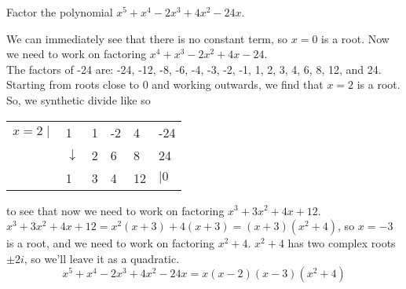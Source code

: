 \begin{example}
Factor the polynomial $x^5 + x^4 -2x^3 + 4x^2 -24x$.	
\end{example}
\begin{answer}
	We can immediately see that there is no constant term, so $x=0$ is a root. Now we need to work on factoring $x^4 + x^3 -2x^2 + 4x - 24$.\\
	The factors of -24 are: -24, -12, -8, -6, -4, -3, -2, -1, 1, 2, 3, 4, 6, 8, 12, and 24. Starting from roots close to 0 and working outwards, we find that $x=2$ is a root. So, we synthetic divide like so
	\begin{table}[H]
		\centering
		\begin{tabular}{llllll}
			$x=2 \mid$ & 1            & 1 & -2 & 4  & -24 \\
			& $\downarrow$ & 2 & 6  & 8  & 24  \\ \hline
			& 1            & 3 & 4  & 12 & $\mid 0$  
		\end{tabular}
	\end{table}
	\noindent
	to see that now we need to work on factoring $x^3+3x^2+4x+12$.
	$x^3+3x^2+4x+12 = x^2(x+3)+4(x+3) = (x+3)(x^2+4)$, so $x=-3$ is a root, and we need to work on factoring $x^2+4$.
	$x^2+4$ has two complex roots $\pm 2i$, so we'll leave it as a quadratic.
	\begin{equation*}	
		x^5 + x^4 -2x^3 + 4x^2 -24x = x(x-2)(x-3)(x^2+4)
	\end{equation*}
\end{answer}